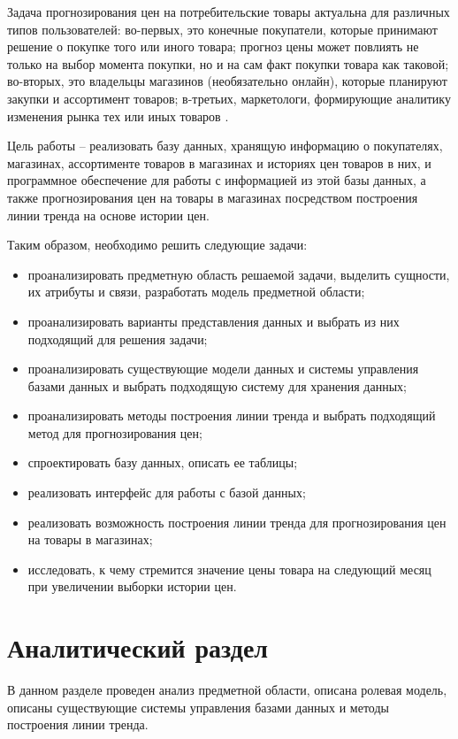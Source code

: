 \documentclass{bmstu}
\begin{document}
Задача прогнозирования цен на потребительские товары актуальна для различных типов пользователей: во-первых, это конечные покупатели, которые принимают решение о покупке того или иного товара; прогноз цены может повлиять не только на выбор момента покупки, но и на сам факт покупки товара как таковой; во-вторых, это владельцы магазинов (необязательно онлайн), которые планируют закупки и ассортимент товаров; в-третьих, маркетологи, формирующие аналитику изменения рынка тех или иных товаров \cite{met-pred-online}.

Цель работы -- реализовать базу данных, хранящую информацию о покупателях, магазинах, ассортименте товаров в магазинах и историях цен товаров в них, и программное обеспечение для работы с информацией из этой базы данных, а также прогнозирования цен на товары в магазинах посредством построения линии тренда на основе истории цен.

Таким образом, необходимо решить следующие задачи:

\begin{itemize}
	\item проанализировать предметную область решаемой задачи, выделить сущности, их атрибуты и связи, разработать модель предметной области;
	\item проанализировать варианты представления данных и выбрать из них подходящий для решения задачи;
	\item проанализировать существующие модели данных и системы управления базами данных и выбрать подходящую систему для хранения данных;
	\item проанализировать методы построения линии тренда и выбрать подходящий метод для прогнозирования цен;
	\item спроектировать базу данных, описать ее таблицы;
	\item реализовать интерфейс для работы с базой данных;
	\item реализовать возможность построения линии тренда для прогнозирования цен на товары в магазинах;
	\item исследовать, к чему стремится значение цены товара на следующий месяц при увеличении выборки истории цен.
\end{itemize}
	
\chapter{Аналитический раздел}

В данном разделе проведен анализ предметной области, описана ролевая модель, описаны существующие системы управления базами данных и методы построения линии тренда.
\end{document}
